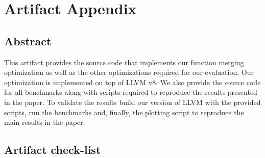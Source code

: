 
\appendix
\section{Artifact Appendix}

\subsection{Abstract}

This artifact provides the source code that implements our function merging
optimization as well as the other optimizations required for our evaluation.
Our optimization is implemented on top of LLVM v8.
We also provide the source code for all benchmarks along with scripts
required to reproduce the results presented in the paper. 
To validate the results build our version of LLVM with the provided scripts,
run the benchmarks and, finally, the plotting script to reproduce the main
results in the paper.

\subsection{Artifact check-list}



